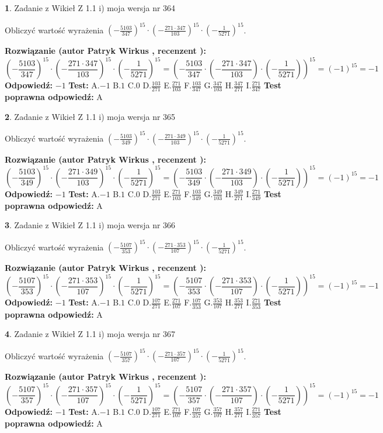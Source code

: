 \documentclass[12pt, a4paper]{article}
\theoremstyle{definition} %
\newtheorem{zad}{}
\newcommand{\zadStart}[1]{\begin{zad}#1\newline}
\newcommand{\zadStop}{\end{zad}}
\newcommand{\rozwStart}[2]{\noindent \textbf{Rozwiązanie (autor #1 , recenzent #2): }\newline}
\newcommand{\rozwStop}{\newline}
\newcommand{\odpStart}{\noindent \textbf{Odpowiedź:}\newline}
\newcommand{\odpStop}{\newline}
\newcommand{\testStart}{\noindent \textbf{Test:}\newline}
\newcommand{\testStop}{\newline}
\newcommand{\kluczStart}{\noindent \textbf{Test poprawna odpowiedź:}\newline}
\newcommand{\kluczStop}{\newline}
\begin{document}
\zadStart{Zadanie z Wikieł Z 1.1 i) moja wersja nr 364}

Obliczyć wartość wyrażenia $(-\frac{5103}{347})^{15} \cdot (-\frac{271 \cdot 347}{103})^{15} \cdot (-\frac{1}{5271})^{15}$.
\zadStop
\rozwStart{Patryk Wirkus}{}
$$(-\frac{5103}{347})^{15} \cdot (-\frac{271 \cdot 347}{103})^{15} \cdot (-\frac{1}{5271})^{15} = (-\frac{5103}{347} \cdot (-\frac{271 \cdot 347}{103}) \cdot (-\frac{1}{5271}))^{15} = (-1)^{15} = -1$$
\rozwStop
\odpStart
$-1$
\odpStop
\testStart
A.$-1$ B.$1$ C.$0$ D.$\frac{103}{271}$ E.$\frac{271}{103}$
F.$\frac{103}{347}$ G.$\frac{347}{103}$
H.$\frac{347}{271}$
I.$\frac{271}{347}$
\testStop
\kluczStart
A
\kluczStop



\zadStart{Zadanie z Wikieł Z 1.1 i) moja wersja nr 365}

Obliczyć wartość wyrażenia $(-\frac{5103}{349})^{15} \cdot (-\frac{271 \cdot 349}{103})^{15} \cdot (-\frac{1}{5271})^{15}$.
\zadStop
\rozwStart{Patryk Wirkus}{}
$$(-\frac{5103}{349})^{15} \cdot (-\frac{271 \cdot 349}{103})^{15} \cdot (-\frac{1}{5271})^{15} = (-\frac{5103}{349} \cdot (-\frac{271 \cdot 349}{103}) \cdot (-\frac{1}{5271}))^{15} = (-1)^{15} = -1$$
\rozwStop
\odpStart
$-1$
\odpStop
\testStart
A.$-1$ B.$1$ C.$0$ D.$\frac{103}{271}$ E.$\frac{271}{103}$
F.$\frac{103}{349}$ G.$\frac{349}{103}$
H.$\frac{349}{271}$
I.$\frac{271}{349}$
\testStop
\kluczStart
A
\kluczStop



\zadStart{Zadanie z Wikieł Z 1.1 i) moja wersja nr 366}

Obliczyć wartość wyrażenia $(-\frac{5107}{353})^{15} \cdot (-\frac{271 \cdot 353}{107})^{15} \cdot (-\frac{1}{5271})^{15}$.
\zadStop
\rozwStart{Patryk Wirkus}{}
$$(-\frac{5107}{353})^{15} \cdot (-\frac{271 \cdot 353}{107})^{15} \cdot (-\frac{1}{5271})^{15} = (-\frac{5107}{353} \cdot (-\frac{271 \cdot 353}{107}) \cdot (-\frac{1}{5271}))^{15} = (-1)^{15} = -1$$
\rozwStop
\odpStart
$-1$
\odpStop
\testStart
A.$-1$ B.$1$ C.$0$ D.$\frac{107}{271}$ E.$\frac{271}{107}$
F.$\frac{107}{353}$ G.$\frac{353}{107}$
H.$\frac{353}{271}$
I.$\frac{271}{353}$
\testStop
\kluczStart
A
\kluczStop



\zadStart{Zadanie z Wikieł Z 1.1 i) moja wersja nr 367}

Obliczyć wartość wyrażenia $(-\frac{5107}{357})^{15} \cdot (-\frac{271 \cdot 357}{107})^{15} \cdot (-\frac{1}{5271})^{15}$.
\zadStop
\rozwStart{Patryk Wirkus}{}
$$(-\frac{5107}{357})^{15} \cdot (-\frac{271 \cdot 357}{107})^{15} \cdot (-\frac{1}{5271})^{15} = (-\frac{5107}{357} \cdot (-\frac{271 \cdot 357}{107}) \cdot (-\frac{1}{5271}))^{15} = (-1)^{15} = -1$$
\rozwStop
\odpStart
$-1$
\odpStop
\testStart
A.$-1$ B.$1$ C.$0$ D.$\frac{107}{271}$ E.$\frac{271}{107}$
F.$\frac{107}{357}$ G.$\frac{357}{107}$
H.$\frac{357}{271}$
I.$\frac{271}{357}$
\testStop
\kluczStart
A
\kluczStop
\end{document}

